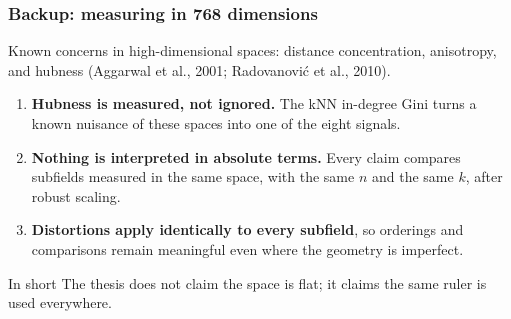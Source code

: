 \documentclass[
	11pt, %
	aspectratio=169, %
]{beamer}
\begin{document}
\begin{frame}
	\frametitle{Backup: measuring in 768 dimensions}

	Known concerns in high-dimensional spaces: distance concentration, anisotropy, and hubness (Aggarwal et al., 2001; Radovanovi\'c et al., 2010).

	\medskip

	\begin{enumerate}
		\setlength{\itemsep}{0.75em}
		\item \textbf{Hubness is measured, not ignored.} The kNN in-degree Gini turns a known nuisance of these spaces into one of the eight signals.
		\item \textbf{Nothing is interpreted in absolute terms.} Every claim compares subfields measured in the same space, with the same $n$ and the same $k$, after robust scaling.
		\item \textbf{Distortions apply identically to every subfield}, so orderings and comparisons remain meaningful even where the geometry is imperfect.
	\end{enumerate}

	\medskip

	\begin{block}{In short}
		The thesis does not claim the space is flat; it claims the same ruler is used everywhere.
	\end{block}
\end{frame}

\end{document}
